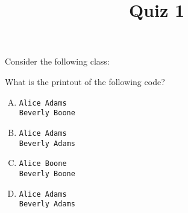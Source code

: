\documentclass{article}
\title{Quiz 1}
\date{}
\begin{document}
\maketitle
\section{}
Consider the following class:

What is the printout of the following code?

\begin{enumerate}[A.]
	\item 
\begin{verbatim}
Alice Adams
Beverly Boone
\end{verbatim}
	\item 
\begin{verbatim}
Alice Adams
Beverly Adams
\end{verbatim}
	\item 
\begin{verbatim}
Alice Boone
Beverly Boone
\end{verbatim}
	\item 
\begin{verbatim}
Alice Adams
Beverly Adams
\end{verbatim}
\end{enumerate}
\end{document}
